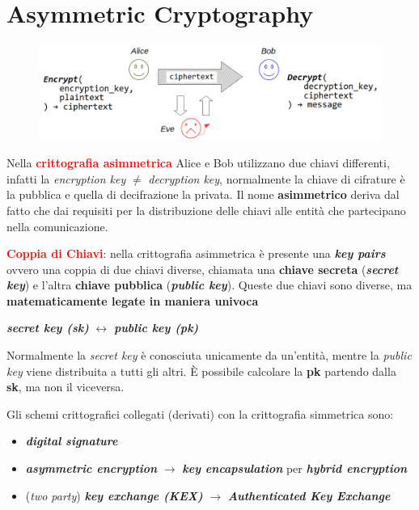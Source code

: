 \chapter{Asymmetric Cryptography}

\begin{flushleft}

    \begin{figure}[h]
        \centering
        \includegraphics[width=\textwidth]{img/asym_crypto.png}
    \end{figure}

    Nella \textcolor{red}{\textbf{crittografia asimmetrica}} Alice e Bob utilizzano due chiavi differenti, infatti la \textit{encryption key} $\neq$ \textit{decryption key}, normalmente la chiave di cifrature è la pubblica e quella di decifrazione la privata. Il nome \textbf{asimmetrico} deriva dal fatto che dai requisiti per la distribuzione delle chiavi alle entità che partecipano nella comunicazione.

    \smallskip

    \textcolor{red}{\textbf{Coppia di Chiavi}}: nella crittografia asimmetrica è presente una \textbf{\textit{key pairs}} ovvero una coppia di due chiavi diverse, chiamata una \textbf{chiave secreta} (\textbf{\textit{secret key}}) e l'altra \textbf{chiave pubblica} (\textbf{\textit{public key}}). Queste due chiavi sono diverse, ma \textbf{matematicamente legate in maniera univoca}

    {\centering
        \textbf{\textit{secret key (sk)}} $\leftrightarrow$ \textbf{\textit{public key (pk)}}
    \par}

    Normalmente la \textit{secret key} è conosciuta unicamente da un'entità, mentre la \textit{public key} viene distribuita a tutti gli altri. È possibile calcolare la \textbf{pk} partendo dalla \textbf{sk}, ma non il viceversa.

    \smallskip

    Gli schemi crittografici collegati (derivati) con la crittografia simmetrica sono:
    \begin{itemize}[nosep]
        \item \textbf{\textit{digital signature}}
        \item \textbf{\textit{asymmetric encryption}} $\rightarrow$ \textbf{\textit{key encapsulation}} per \textbf{\textit{hybrid encryption}}
        \item (\textit{two party}) \textbf{\textit{key exchange (KEX)}} $\rightarrow$ \textbf{\textit{Authenticated Key Exchange}}
    \end{itemize}


\end{flushleft}
